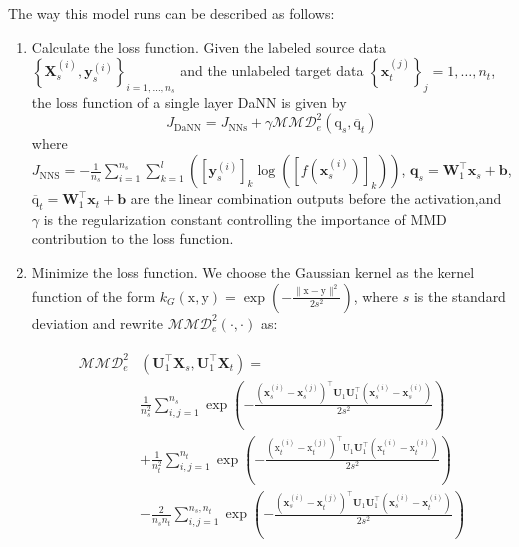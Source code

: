 \documentclass[conference]{IEEEtran}
\begin{document}
The way this model runs can be described as follows:
\begin{enumerate}
\item Calculate the loss function. Given the labeled source data $\left\{\mathbf{X}_{s}^{(i)}, \mathbf{y}_{s}^{(i)}\right\}_{i=1, \ldots, n_{s}}$ and the unlabeled target data $\left\{\mathbf{x}_{t}^{(j)}\right\}_{j}=1, \ldots, n_{t}$, the loss function of a single layer DaNN is given by
\begin{equation}
J_{\mathrm{DaNN}}=J_{\mathrm{NNs}}+\gamma \mathcal{M M D}_{e}^{2}\left(\mathrm{q}_{s}, \overline{\mathrm{q}}_{t}\right)
\end{equation}
where \\
$J_{\mathrm{NNS}}=-\frac{1}{n_{s}} \sum_{i=1}^{n_{s}} \sum_{k=1}^{l}\left(\left[\mathbf{y}_{s}^{(i)}\right]_{k} \log \left(\left[f\left(\mathbf{x}_{s}^{(i)}\right)\right]_{k}\right)\right)$, $\mathbf{q}_{s}=\mathbf{W}_{1}^{\top} \mathbf{x}_{s}+\mathbf{b}$, $\overline{\mathrm{q}}_{t}= \mathbf{W}_{1}^{\top} \mathbf{x}_{t}+\mathbf{b}$ are the linear combination outputs before the activation,and $\gamma$ is the regularization constant controlling the importance of MMD contribution to the loss function.\\
\item Minimize the loss function. We choose the Gaussian kernel as the kernel function of the form $k_{G}(\mathrm{x}, \mathrm{y})=\exp \left(-\frac{\|\mathrm{x}-\mathrm{y}\|^{2}}{2 s^{2}}\right)$, where $s$ is the standard deviation and rewrite $\mathcal{M} \mathcal{M} \mathcal{D}_{e}^{2}(\cdot, \cdot)$ as:
\begin{tiny}
\begin{eqnarray}
\begin{aligned}
\mathcal{M M D}_{e}^{2}&\left(\mathbf{U}_{1}^{\top} \mathbf{X}_{s}, \mathbf{U}_{1}^{\top} \mathbf{X}_{t}\right)= \\
& \frac{1}{n_{s}^{2}} \sum_{i, j=1}^{n_{s}} \exp \left(-\frac{\left(\mathbf{x}_{s}^{(i)}-\mathbf{x}_{s}^{(j)}\right)^{\top} \mathbf{U}_{1} \mathbf{U}_{1}^{\top}\left(\mathbf{x}_{s}^{(i)}-\mathbf{x}_{s}^{(i)}\right)}{2 s^{2}}\right)\\
& +\frac{1}{n_{t}^{2}} \sum_{i, j=1}^{n_{t}} \exp \left(-\frac{\left(\mathrm{x}_{t}^{(i)}-\mathrm{x}_{t}^{(j)}\right)^{\top} \mathrm{U}_{1} \mathbf{U}_{1}^{\top}\left(\mathrm{x}_{t}^{(i)}-\mathrm{x}_{t}^{(i)}\right)}{2 s^{2}}\right)\\
& -\frac{2}{n_{s} n_{t}} \sum_{i, j=1}^{n_{s}, n_{t}} \exp \left(-\frac{\left(\mathbf{x}_{s}^{(i)}-\mathbf{x}_{t}^{(j)}\right)^{\top} \mathbf{U}_{1} \mathbf{U}_{1}^{\top}\left(\mathbf{x}_{s}^{(i)}-\mathbf{x}_{t}^{(i)}\right)}{2 s^{2}}\right)

\end{aligned}
\end{eqnarray}
\end{tiny}
\end{enumerate}
\end{document}
